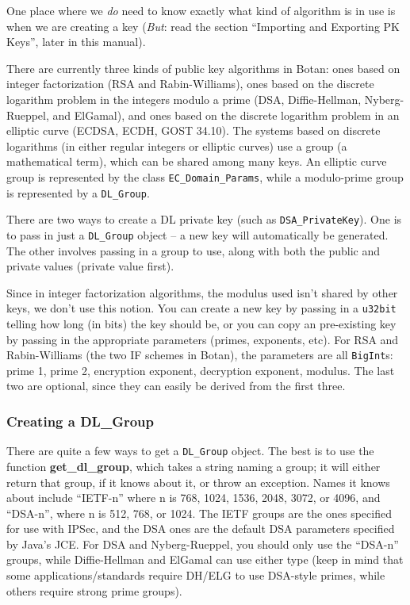 \documentclass{article}
\newcommand{\function}[1]{\textbf{#1}}
\newcommand{\type}[1]{\texttt{#1}}
\begin{document}
One place where we \emph{do} need to know exactly what kind of
algorithm is in use is when we are creating a key (\emph{But}: read
the section ``Importing and Exporting PK Keys'', later in this
manual).

There are currently three kinds of public key algorithms in Botan:
ones based on integer factorization (RSA and Rabin-Williams), ones
based on the discrete logarithm problem in the integers modulo a prime
(DSA, Diffie-Hellman, Nyberg-Rueppel, and ElGamal), and ones based on
the discrete logarithm problem in an elliptic curve (ECDSA, ECDH, GOST
34.10). The systems based on discrete logarithms (in either regular
integers or elliptic curves) use a group (a mathematical term), which
can be shared among many keys. An elliptic curve group is represented
by the class \type{EC\_Domain\_Params}, while a modulo-prime group is
represented by a \type{DL\_Group}.

There are two ways to create a DL private key (such as
\type{DSA\_PrivateKey}). One is to pass in just a \type{DL\_Group}
object -- a new key will automatically be generated. The other
involves passing in a group to use, along with both the public and
private values (private value first).

Since in integer factorization algorithms, the modulus used isn't shared by
other keys, we don't use this notion. You can create a new key by passing in a
\type{u32bit} telling how long (in bits) the key should be, or you can copy an
pre-existing key by passing in the appropriate parameters (primes, exponents,
etc). For RSA and Rabin-Williams (the two IF schemes in Botan), the parameters
are all \type{BigInt}s: prime 1, prime 2, encryption exponent, decryption
exponent, modulus. The last two are optional, since they can easily be derived
from the first three.

\subsubsection{Creating a DL\_Group}

There are quite a few ways to get a \type{DL\_Group} object. The best is to use
the function \function{get\_dl\_group}, which takes a string naming a group; it
will either return that group, if it knows about it, or throw an
exception. Names it knows about include ``IETF-n'' where n is 768, 1024, 1536,
2048, 3072, or 4096, and ``DSA-n'', where n is 512, 768, or 1024. The IETF
groups are the ones specified for use with IPSec, and the DSA ones are the
default DSA parameters specified by Java's JCE. For DSA and Nyberg-Rueppel, you
should only use the ``DSA-n'' groups, while Diffie-Hellman and ElGamal can use
either type (keep in mind that some applications/standards require DH/ELG to
use DSA-style primes, while others require strong prime groups).
\end{document}
